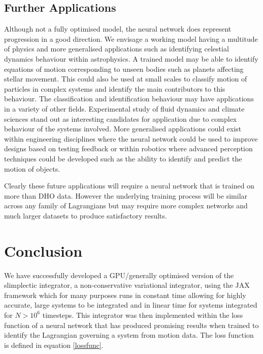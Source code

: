 \documentclass[10pt]{iopart}
\begin{document}
\subsection{Further Applications}

Although not a fully optimised model, the neural network does represent progression in a good direction. We envisage a working model having a multitude of physics and more generalised applications such as identifying celestial dynamics  behaviour within astrophysics. A trained model may be able to identify equations of motion corresponding to unseen bodies such as planets affecting stellar movement. This could also be used at small scales to classify motion of particles in complex systems and identify the main contributors to this behaviour. The classification and identification behaviour may have applications in a variety of other fields. Experimental study of fluid dynamics and climate sciences stand out as interesting candidates for application due to complex behaviour of the systems involved. 
More generalised applications could exist within engineering disciplines where the neural network could be used to improve designs based on testing feedback or within robotics where advanced perception techniques could be developed such as the ability to identify and predict the motion of objects.

Clearly these future applications will require a neural network that is trained on more than DHO data. However the underlying training process will be similar across any family of Lagrangians but may require more complex networks and much larger datasets to produce satisfactory results.



\section{Conclusion}
We have successfully developed a GPU/generally optimised version of the slimplectic integrator, a non-conservative variational integrator, using the JAX framework which for many purposes runs in constant time allowing for highly accurate, large systems to be integrated and in linear time for systems integrated for $N>10^6$ timesteps. This integrator was then implemented within the loss function of a neural network that has produced promising results when trained to identify the Lagrangian governing a system from motion data. The loss function is defined in equation \ref{lossfunc}. 
\end{document}
